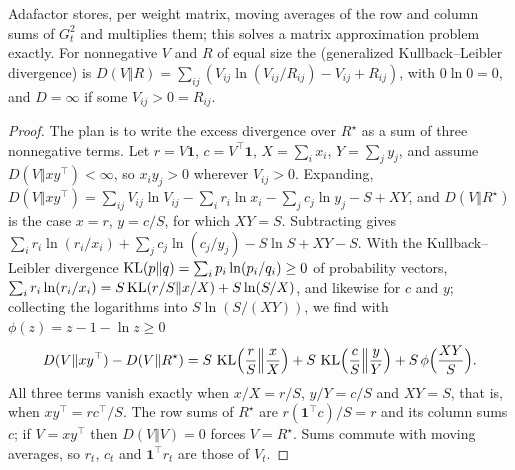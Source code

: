 \begin{refsection}
Adafactor stores, per weight matrix, moving averages of the row and column sums of $G_t^2$ and multiplies them; this solves a matrix approximation problem exactly. For nonnegative $V$ and $R$ of equal size the  (generalized Kullback--Leibler divergence) is $D(V\Vert R)=\sum_{ij}(V_{ij}\ln(V_{ij}/R_{ij})-V_{ij}+R_{ij})$, with $0\ln0=0$, and $D=\infty$ if some $V_{ij}>0=R_{ij}$.


\begin{proof}
The plan is to write the excess divergence over $R^\star$ as a sum of three nonnegative terms. Let $r=V\mathbf1$, $c=V^\top\mathbf1$, $X=\sum_ix_i$, $Y=\sum_jy_j$, and assume $D(V\Vert xy^\top)<\infty$, so $x_iy_j>0$ wherever $V_{ij}>0$. Expanding, $D(V\Vert xy^\top)=\sum_{ij}V_{ij}\ln V_{ij}-\sum_ir_i\ln x_i-\sum_jc_j\ln y_j-S+XY$, and $D(V\Vert R^\star)$ is the case $x=r$, $y=c/S$, for which $XY=S$. Subtracting gives $\sum_ir_i\ln(r_i/x_i)+\sum_jc_j\ln(c_j/y_j)-S\ln S+XY-S$. With the Kullback--Leibler divergence $\operatorname{KL}(p\Vert q)=\sum_ip_i\ln(p_i/q_i)\ge0$ of probability vectors, $\sum_ir_i\ln(r_i/x_i)=S\operatorname{KL}(r/S\Vert x/X)+S\ln(S/X)$, and likewise for $c$ and $y$; collecting the logarithms into $S\ln(S/(XY))$, we find with $\phi(z)=z-1-\ln z\ge0$
\[
  D(V\Vert xy^\top)-D(V\Vert R^\star)=S\,\operatorname{KL}\Bigl(\frac rS\Big\Vert\frac xX\Bigr)+S\,\operatorname{KL}\Bigl(\frac cS\Big\Vert\frac yY\Bigr)+S\,\phi\Bigl(\frac{XY}S\Bigr).
\]
All three terms vanish exactly when $x/X=r/S$, $y/Y=c/S$ and $XY=S$, that is, when $xy^\top=rc^\top/S$. The row sums of $R^\star$ are $r(\mathbf1^\top c)/S=r$ and its column sums $c$; if $V=xy^\top$ then $D(V\Vert V)=0$ forces $V=R^\star$. Sums commute with moving averages, so $r_t$, $c_t$ and $\mathbf1^\top r_t$ are those of $V_t$.
\end{proof}


\end{refsection}
